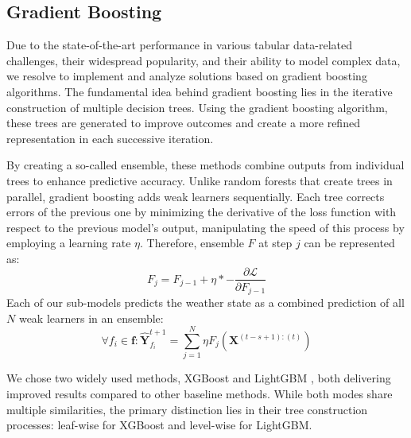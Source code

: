\subsection{Gradient Boosting}
Due to the state-of-the-art performance in various tabular data-related challenges, their widespread popularity, and their ability to model complex data, we resolve to implement and analyze solutions based on gradient boosting algorithms. The fundamental idea behind gradient boosting lies in the iterative construction of multiple decision trees. Using the gradient boosting algorithm, these trees are generated to improve outcomes and create a more refined representation in each successive iteration. 

By creating a so-called ensemble, these methods combine outputs from individual trees to enhance predictive accuracy. Unlike random forests that create trees in parallel, gradient boosting adds weak learners sequentially. Each tree corrects errors of the previous one by minimizing the derivative of the loss function with respect to the previous model's output, manipulating the speed of this process by employing a learning rate $\eta$. Therefore, ensemble $F$ at step $j$ can be represented as: 
\[
    F_j = F_{j-1} + \eta * -\frac{\partial \mathcal{L}}{\partial F_{j-1}}
\]
Each of our sub-models predicts the weather state as a combined prediction of all $N$ weak learners in an ensemble:
\[
     \forall f_i \in \mathbf{f}: \hat{\mathbf{Y}}^{t+1}_{f_i} = \sum_{j=1}^{N}\eta F_j\left(\mathbf{X}^{(t-s+1):(t)}\right)
\]


We chose two widely used methods, XGBoost \cite{Chen_2016} and LightGBM \cite{ke2017lightgbm}, both delivering improved results compared to other baseline methods. While both modes share multiple similarities, the primary distinction lies in their tree construction processes: leaf-wise for XGBoost and level-wise for LightGBM.

